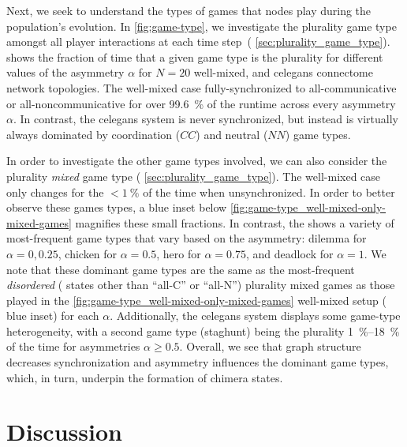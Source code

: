 \documentclass[pdflatex,lineno,referee,sn-nature]{sn-jnl}
\begin{document}
Next, we seek to understand the types of games
that nodes play during the population's evolution.
In \cref{fig:game-type}, we investigate the plurality game type
amongst all player interactions at each time step~(\cf{} \cref{sec:plurality_game_type}).
 shows the fraction of time
that a given game type is the plurality for different values
of the asymmetry $\alpha$ for
$N=20$ well-mixed,
and
\gls{celegans} connectome
network topologies.
The  well-mixed case
fully-synchronized to all-communicative or all-noncommunicative
for over \SI{99.6}{\percent} of the runtime
across every asymmetry $\alpha$.
In contrast, the
 \gls{celegans} system
is never synchronized, but instead is virtually always dominated by
coordination ($CC$) and neutral ($NN$) game types.

In order to investigate the other game types involved,
we can also consider the plurality \emph{mixed} game type
(\cf{} \cref{sec:plurality_game_type}).
The  well-mixed case
only changes for the $< \SI{1}{\percent}$ of the time when unsynchronized.
In order to better observe these games types,
a blue inset below \cref{fig:game-type_well-mixed-only-mixed-games}
magnifies these small fractions.
In contrast, the 
shows a variety of most-frequent game types
that vary based on the asymmetry:
dilemma for $\alpha = 0, 0.25$, chicken for $\alpha = 0.5$,
hero for $\alpha = 0.75$, and deadlock for $\alpha = 1$.
We note that these dominant game types
are the same as the most-frequent \emph{disordered}
(\ie{} states other than ``all-C'' or ``all-N'')
plurality mixed games as those played in
the \cref{fig:game-type_well-mixed-only-mixed-games}
well-mixed setup (\cf{} blue inset) for each $\alpha$.
Additionally, the \gls{celegans} system displays
some game-type heterogeneity, with
a second game type (staghunt) being the plurality
\SIrange{1}{18}{\percent} of the time
for asymmetries $\alpha \ge 0.5$.
Overall, we see that graph structure decreases synchronization
and asymmetry influences the dominant game types, which, in turn,
underpin the formation of chimera states.

\section{Discussion}\label{sec:discussion}
\end{document}
